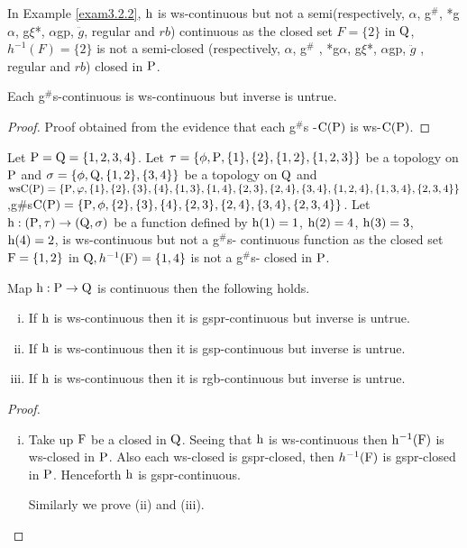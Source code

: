 \begin{exm}\label{exam3.2.3}
In Example \ref{exam3.2.2}, $\mathrm{h}$ is ws-continuous but not a semi(respectively, $\alpha$, g$^{\#}$, *g$\alpha$, g$\xi$*, $\alpha$gp, $\ddot{g}$, regular and $rb$) continuous as the closed set $F=\{2\}$ in $\mathrm{Q}$, $h^{-1}(F)=\{ 2\}$ is not a semi-closed (respectively, $\alpha$, g$^{\#}$ , *g$\alpha$, g$\xi$*, $\alpha$gp, $\ddot{g}$ , regular and $rb$) closed in $\mathrm{P}$.
\end{exm}

\begin{thm}\label{thm3.2.3}
Each g$^{\#}$s-continuous is ws-continuous but inverse is untrue.
\end{thm}

\begin{proof}
Proof obtained from the evidence that each g$^{\#}$s -$\mathrm{C}(\mathrm{P})$ is ws-$\mathrm{C}(\mathrm{P})$.
\end{proof}

\begin{exm}\label{exam3.2.4}
Let $\mathrm{P}=\mathrm{Q}= \{1, 2, 3, 4\}$. Let $\tau = \{\phi, \mathrm{P}, \{1\}, \{2\}, \{1, 2\},\{1,2,3\}\}$ be a topology on $\mathrm{P}$ and $\sigma =\{\phi, \mathrm{Q}, \{1,2\},\{3,4\}\}$ be a topology on $\mathrm{Q}$ and $\mathrm{ws}\mathrm{C}(\mathrm{P})=\{\mathrm{P}, \varphi,\{1\},\{2\},\{3\},\{4\},\{1,3\},\{1,4\},\{2,3\},\{2,4\},\{3,4\},\{1,2,4\},\{1,3,4\},\{2,3,4\}\}$,\break g\#s$\mathrm{C}(\mathrm{P})=\{\mathrm{P},\phi,\{2\}, \{3\},\{4\},\{2,3\},\{2,4\},\{3,4\},\{2,3,4\}\}$. Let $\mathrm{h}: (\mathrm{P}, \tau  )\to (\mathrm{Q}, \sigma)$ be a function defined by $\mathrm{h}(1)= 1$, $\mathrm{h}(2)=4$, $\mathrm{h}(3)=3$, $\mathrm{h}(4)=2$, is ws-continuous but not a g$^{\#}$s- continuous function as the closed set $\mathrm{F}=\{1,2\}$ in $\mathrm{Q}, h^{-1} (\mathrm{F})=\{1,4\}$ is not a g$^{\#}$s- closed in $\mathrm{P}$.
\end{exm}

\begin{thm}\label{thm3.2.4}
Map $\mathrm{h}: \mathrm{P}\to \mathrm{Q}$ is continuous then the following holds.
\begin{enumerate}[(i)]
\item If $\mathrm{h}$ is ws-continuous then it is gspr-continuous but inverse is untrue.
\item If $\mathrm{h}$ is ws-continuous then it is gsp-continuous but inverse is untrue.
\item If $\mathrm{h}$ is ws-continuous then it is rgb-continuous but inverse is untrue.
\end{enumerate}
\end{thm}

\begin{proof}
\begin{enumerate}[(i)]
\item Take up $\mathrm{F}$ be a closed in $\mathrm{Q}$. Seeing that $\mathrm{h}$ is ws-continuous then $\mathrm{h}^{-1} (\mathrm{F})$ is ws-closed in $\mathrm{P}$. Also each ws-closed is gspr-closed, then $h^{-1}(\mathrm{F})$ is gspr-closed in $\mathrm{P}$. Henceforth $\mathrm{h}$ is gspr-continuous.

Similarly we prove (ii) and (iii).
\end{enumerate}
\end{proof}

